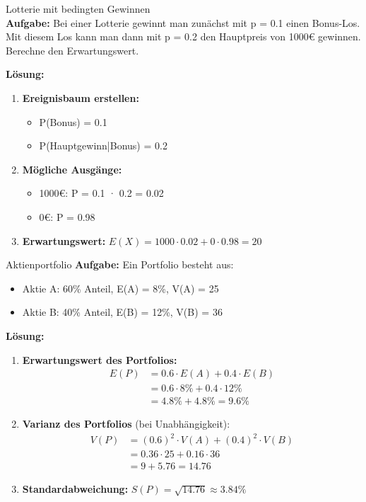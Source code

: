 \begin{example}{Lotterie mit bedingten Gewinnen}\\
\textbf{Aufgabe:} Bei einer Lotterie gewinnt man zunächst mit p = 0.1 einen Bonus-Los. Mit diesem Los kann man dann mit p = 0.2 den Hauptpreis von 1000€ gewinnen. Berechne den Erwartungswert.

\textbf{Lösung:}
\begin{enumerate}
\item \textbf{Ereignisbaum erstellen:}
   \begin{itemize}
   \item P(Bonus) = 0.1
   \item P(Hauptgewinn|Bonus) = 0.2
   \end{itemize}

\item \textbf{Mögliche Ausgänge:}
   \begin{itemize}
   \item 1000€: P = 0.1 · 0.2 = 0.02
   \item 0€: P = 0.98
   \end{itemize}

\item \textbf{Erwartungswert:}
   $E(X) = 1000 \cdot 0.02 + 0 \cdot 0.98 = 20$
\end{enumerate}
\end{example}

\begin{example}{Aktienportfolio}
\textbf{Aufgabe:} Ein Portfolio besteht aus:
\begin{itemize}
\item Aktie A: 60\% Anteil, E(A) = 8\%, V(A) = 25
\item Aktie B: 40\% Anteil, E(B) = 12\%, V(B) = 36
\end{itemize}

\textbf{Lösung:}
\begin{enumerate}
\item \textbf{Erwartungswert des Portfolios:}
   \begin{align*}
   E(P) &= 0.6 \cdot E(A) + 0.4 \cdot E(B) \\
   &= 0.6 \cdot 8\% + 0.4 \cdot 12\% \\
   &= 4.8\% + 4.8\% = 9.6\%
   \end{align*}

\item \textbf{Varianz des Portfolios} (bei Unabhängigkeit):
   \begin{align*}
   V(P) &= (0.6)^2 \cdot V(A) + (0.4)^2 \cdot V(B) \\
   &= 0.36 \cdot 25 + 0.16 \cdot 36 \\
   &= 9 + 5.76 = 14.76
   \end{align*}

\item \textbf{Standardabweichung:}
   $S(P) = \sqrt{14.76} \approx 3.84\%$
\end{enumerate}
\end{example}

